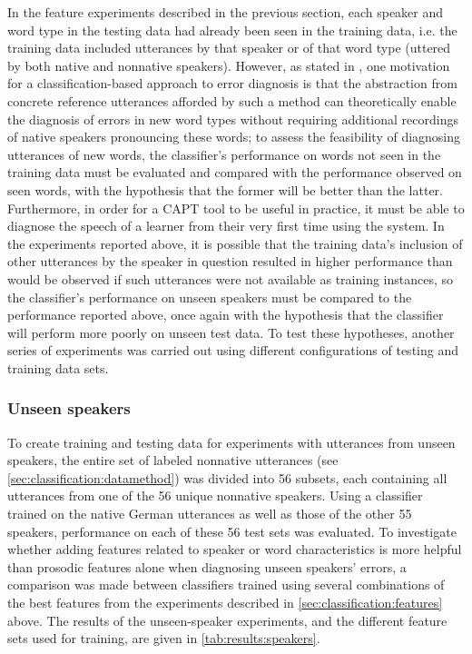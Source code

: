 	In the feature experiments described in the previous section, each speaker and word type in the testing data had already been seen in the training data, i.e. the training data included utterances by that speaker or of that word type (uttered by both native and nonnative speakers). However, as stated in , one motivation for a classification-based approach to error diagnosis is that the abstraction from concrete reference utterances afforded by such a method can theoretically enable the diagnosis of errors in new word types without requiring additional recordings of native speakers pronouncing these words; to assess the feasibility of diagnosing utterances of new words, the classifier's performance on words not seen in the training data must be evaluated and compared with the performance observed on seen words, with the hypothesis that the former will be better than the latter. Furthermore, in order for a CAPT tool to be useful in practice, it must be able to diagnose the speech of a learner from their very first time using the system. In the experiments reported above, it is possible that the training data's inclusion of other utterances by the speaker in question resulted in higher performance than would be observed if such utterances were not available as training instances, so the classifier's performance on unseen speakers must be compared to the performance reported above, once again with the hypothesis that the classifier will perform more poorly on unseen test data. To test these hypotheses, another series of experiments was carried out using different configurations of testing and training data sets. 
	
	
	\subsubsection{Unseen speakers}	
	
	To create training and testing data for experiments with utterances from unseen speakers, the entire set of labeled nonnative utterances (see \cref{sec:classification:datamethod}) was divided into 56 subsets, each containing all utterances from one of the 56 unique nonnative speakers. Using a classifier trained on the native German utterances as well as those of the other 55 speakers, performance on each of these 56 test sets was evaluated. To investigate whether adding features related to speaker or word characteristics is more helpful than prosodic features alone when diagnosing unseen speakers' errors, a comparison was made between classifiers trained using several combinations of the best features from the experiments described in \cref{sec:classification:features} above. The results of the unseen-speaker experiments, and the different feature sets used for training, are given in \cref{tab:results:speakers}.
		
